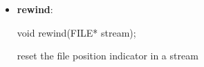 \documentclass{report}
\begin{document}
\begin{itemize}
\begin{cppcode}
            int main(void) {
                FILE *fp = fopen("data.txt", "r");

                if (fp == NULL) {
                    perror("fopen");
                    return 1;
                }

                fseek(fp, 0, SEEK_END);

                long size = ftell(fp);

                if (size == -1L) {
                    perror("ftell");
                    fclose(fp);
                    return 1;
                }

                printf("File size: %

                fclose(fp);
                return 0;
            }
            \end{cppcode}
        \item \textbf{rewind}:
            \bigbreak \noindent 
            \begin{cppcode}
            void rewind(FILE* stream);
            \end{cppcode}
            \bigbreak \noindent 
            reset the file position indicator in a stream




    \end{itemize}

    \pagebreak 
\end{document}
